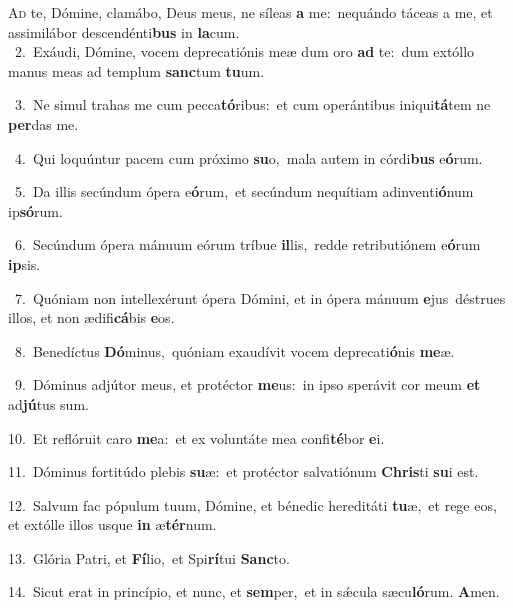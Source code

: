 \lettrine{\initial\textcolor{\initialcolor}{A}}{d} te, Dómine, clamábo, Deus meus, ne síleas \textbf{a} me:~\star nequándo táceas a me, et assimilábor descendénti\textbf{bus} in \textbf{la}\-cum.\\
{\numbfont\textcolor{\numbcolor}{~2.}}~Exáudi, Dómine, vocem deprecatiónis meæ dum oro \textbf{ad} te:~\star dum extóllo manus meas ad templum \textbf{sanc}\-tum \textbf{tu}\-um.\par
{\numbfont\textcolor{\numbcolor}{~3.}}~Ne simul trahas me cum pecca\-\textbf{tó}\-ribus:~\star et cum operántibus iniqui\-\textbf{tá}\-tem ne \textbf{per}\-das me.\par
{\numbfont\textcolor{\numbcolor}{~4.}}~Qui loquúntur pacem cum próximo \textbf{su}\-o,~\star mala autem in córdi\textbf{bus} e\-\textbf{ó}\-rum.\par
{\numbfont\textcolor{\numbcolor}{~5.}}~Da illis secúndum ópera e\-\textbf{ó}\-rum,~\star et secúndum nequítiam adinventi\-\textbf{ó}\-num ip\-\textbf{só}\-rum.\par
{\numbfont\textcolor{\numbcolor}{~6.}}~Secúndum ópera mánuum eórum tríbue \textbf{il}\-lis,~\star redde retributiónem e\-\textbf{ó}\-rum \textbf{ip}\-sis.\par
{\numbfont\textcolor{\numbcolor}{~7.}}~Quóniam non intellexérunt ópera Dómini, et in ópera mánuum \textbf{e}\-jus~\star déstrues illos, et non ædifi\-\textbf{cá}\-bis \textbf{e}\-os.\par
{\numbfont\textcolor{\numbcolor}{~8.}}~Benedíctus \textbf{Dó}\-minus,~\star quóniam exaudívit vocem deprecati\-\textbf{ó}\-nis \textbf{me}\-æ.\par
{\numbfont\textcolor{\numbcolor}{~9.}}~Dóminus adjútor meus, et protéctor \textbf{me}\-us:~\star in ipso sperávit cor meum \textbf{et} ad\-\textbf{jú}\-tus sum.\par
{\numbfont\textcolor{\numbcolor}{10.}}~Et reflóruit caro \textbf{me}\-a:~\star et ex voluntáte mea confi\-\textbf{té}\-bor \textbf{e}\-i.\par
{\numbfont\textcolor{\numbcolor}{11.}}~Dóminus fortitúdo plebis \textbf{su}\-æ:~\star et protéctor salvatiónum \textbf{Chris}\-ti \textbf{su}\-i est.\par
{\numbfont\textcolor{\numbcolor}{12.}}~Salvum fac pópulum tuum, Dómine, et bénedic hereditáti \textbf{tu}\-æ,~\star et rege eos, et extólle illos usque \textbf{in} æ\-\textbf{tér}\-num.\par
{\numbfont\textcolor{\numbcolor}{13.}}~Glória Patri, et \textbf{Fí}\-lio,~\star et Spi\-\textbf{rí}\-tui \textbf{Sanc}\-to.\par
{\numbfont\textcolor{\numbcolor}{14.}}~Sicut erat in princípio, et nunc, et \textbf{sem}\-per,~\star et in sǽcula sæcu\-\textbf{ló}\-rum. \textbf{A}\-men.\par
